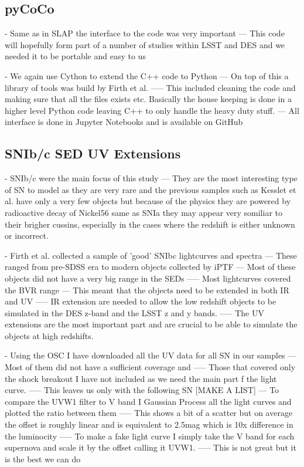 \subsection{pyCoCo}
- Same as in SLAP the interface to the code was very important
--- This code will hopefully form part of a number of studies within LSST and DES and we needed it to be portable and easy to us

- We again use Cython to extend the C++ code to Python
--- On top of this a library of tools was build by Firth et al.
----- This included cleaning the code and making sure that all the files exists etc. Basically the house keeping is done in a higher level Python code leaving C++ to only handle the heavy duty stuff.
--- All interface is done in Jupyter Notebooks and is available on GitHub

\subsection{SNIb/c SED UV Extensions}
- SNIb/c were the main focus of this study
--- They are the most interesting type of SN to model as they are very rare and the previous samples such as Kesslet et al. have only a very few objects but because of the physics they are powered by radioactive decay of Nickel56 same as SNIa they may appear very somiliar to their brigher cussins, especially in the cases where the redshift is either unknown or incorrect.

- Firth et al. collected a sample of 'good' SNIbc lightcurves and spectra
--- These ranged from pre-SDSS era to modern objects collected by iPTF
--- Most of these objects did not have a very big range in the SEDs
----- Most lightcurves covered the BVR range
--- This meant that the objects need to be extended in both IR and UV
----- IR extension are needed to allow the low redshift objects to be simulated in the DES z-band and the LSST z and y bands.
----- The UV extensions are the most important part and are crucial to be able to simulate the objects at high redshifts.

- Using the OSC I have downloaded all the UV data for all SN in our samples
--- Most of them did not have a sufficient coverage and
----- Those that covered only the shock breakout I have not included as we need the main part f the light curve.
----- This leaves us only with the following SN [MAKE A LIST]
--- To compare the UVW1 filter to V band I Gaussian Process all the light curves and plotted the ratio between them
----- This shows a bit of a scatter but on average the offset is roughly linear and is equivalent to 2.5mag which is 10x difference in the luminocity
----- To make a fake light curve I simply take the V band for each supernova and scale it by the offset calling it UVW1.
----- This is not great but it is the best we can do

